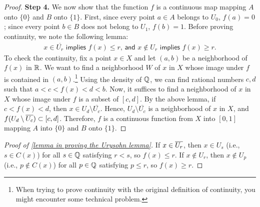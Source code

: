 \begin{proof}
    \textbf{Step 4.}
    We now show that the function $f$ is a continuous map mapping $A$ onto $\{0\}$ and $B$ onto $\{1\}$.
    First, since every point $a\in A$ belongs to $U_0$, $f(a)=0$; since every point $b\in B$ does not belong to $U_1$, $f(b)=1$.
    Before proving continuity, we note the following lemma:
    \begin{align}\label{lemma in proving the Urysohn lemma}
        \textsf{$x\in\overline{U_r}$ implies $f(x)\leq r$, and $x\notin U_r$ implies $f(x)\geq r$.}
    \end{align}
    To check the continuity, fix a point $x\in X$ and let $(a, b)$ be a neighborhood of $f(x)$ in ${\mathbb{R}}$.
    We want to find a neighborhood $W$ of $x$ in $X$ whose image under $f$ is contained in $(a, b)$.\footnote{When trying to prove continuity with the original definition of continuity, you might encounter some technical problem.}
    Using the density of ${\mathbb{Q}}$, we can find rational numbers $c, d$ such that $a<c<f(x)<d<b$.
    Now, it suffices to find a neighborhood of $x$ in $X$ whose image under $f$ is a subset of $[c, d]$.
    By the above lemma, if $c<f(x)<d$, then $x\in U_d\setminus\overline{U_c}$.
    Hence, $U_d\setminus\overline{U_c}$ is a neighborhood of $x$ in $X$, and $f(U_d\setminus\overline{U_c})\subset[c, d]$.
    Therefore, $f$ is a continuous function from $X$ into $[0, 1]$ mapping $A$ into $\{0\}$ and $B$ onto $\{1\}$.
\end{proof}
\begin{proof}[Proof of \cref{lemma in proving the Urysohn lemma}]
    If $x\in \overline{U_r}$, then $x\in U_s$ (i.e., $s\in C(x)$) for all $s\in{\mathbb{Q}}$ satisfying $r<s$, so $f(x)\leq r$.
    If $x\notin U_r$, then $x\notin U_p$ (i.e., $p\notin C(x)$) for all $p\in{\mathbb{Q}}$ satisfying $p\leq r$, so $f(x)\geq r$.
\end{proof}

